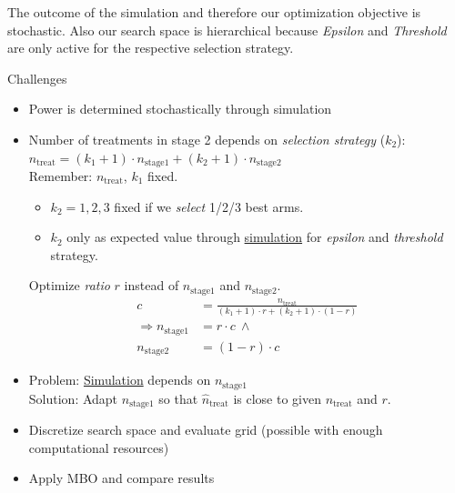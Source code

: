 \documentclass[bimj,fleqn]{w-art}
\theoremstyle{plain}
\theoremstyle{definition}
\begin{document}


The outcome of the simulation and therefore our optimization objective is stochastic.
Also our search space is hierarchical because \emph{Epsilon} and \emph{Threshold} are only active for the respective selection strategy.



Challenges
  \begin{itemize}
    \item Power is determined stochastically through simulation
    \item Number of treatments in stage 2 depends on \emph{selection strategy} ($k_2$): \\
    $n_{\text{treat}} = (k_1+1) \cdot n_{\text{stage1}} + (k_2+1) \cdot n_{\text{stage2}}$ \\
    Remember: $n_{\text{treat}}$, $k_1$ fixed.
    \begin{itemize}
      \item $k_2 = 1,2,3$ fixed if we \emph{select} 1/2/3 best arms.
      \item $k_2$ only as expected value through \underline{simulation} for \emph{epsilon} and \emph{threshold} strategy.
    \end{itemize}
    Optimize \emph{ratio} $r$ instead of $n_{\text{stage1}}$ and $n_{\text{stage2}}$.
    \begin{align}
      c &= \frac{n_{\text{treat}}}{(k_1 + 1) \cdot r + (k_2+1) \cdot (1-r)} \\
      \Rightarrow n_{\text{stage1}} &= r \cdot c \ \land\\
       n_{\text{stage2}} &= (1-r) \cdot c 
    \end{align}
    \item Problem: \underline{Simulation} depends on $n_{\text{stage1}}$ \\
      Solution: Adapt $n_{\text{stage1}}$ so that $\hat{n}_{\text{treat}}$ is close to given $n_{\text{treat}}$ and $r$.
  \end{itemize}



\begin{itemize}
  \item Discretize search space and evaluate grid (possible with enough computational resources)
  \item Apply MBO and compare results
\end{itemize}
\end{document}
